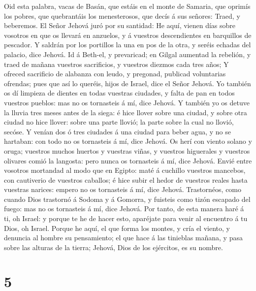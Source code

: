  Oid esta palabra, vacas de Basán, que estáis en el monte
de Samaria, que oprimís los pobres, que quebrantáis los menesterosos,
que decís á sus señores: Traed, y beberemos.  El Señor
Jehová juró por su santidad: He aquí, vienen días sobre vosotros en que
os llevará en anzuelos, y á vuestros descendientes en barquillos de
pescador.  Y saldrán por los portillos la una en pos de la
otra, y seréis echadas del palacio, dice Jehová.  Id á
Beth-el, y prevaricad; en Gilgal aumentad la rebelión, y traed de mañana
vuestros sacrificios, y vuestros diezmos cada tres años; 
Y ofreced sacrificio de alabanza con leudo, y pregonad, publicad
voluntarias ofrendas; pues que así lo queréis, hijos de Israel, dice el
Señor Jehová.  Yo también os dí limpieza de dientes en
todas vuestras ciudades, y falta de pan en todos vuestros pueblos: mas
no os tornasteis á mí, dice Jehová.  Y también yo os
detuve la lluvia tres meses antes de la siega: é hice llover sobre una
ciudad, y sobre otra ciudad no hice llover: sobre una parte llovió; la
parte sobre la cual no llovió, secóse.  Y venían dos ó
tres ciudades á una ciudad para beber agua, y no se hartaban: con todo
no os tornasteis á mí, dice Jehová.  Os herí con viento
solano y oruga; vuestros muchos huertos y vuestras viñas, y vuestros
higuerales y vuestros olivares comió la langosta: pero nunca os
tornasteis á mí, dice Jehová.  Envié entre vosotros
mortandad al modo que en Egipto: maté á cuchillo vuestros mancebos, con
cautiverio de vuestros caballos; é hice subir el hedor de vuestros
reales hasta vuestras narices: empero no os tornasteis á mí, dice
Jehová.  Trastornéos, como cuando Dios trastornó á Sodoma
y á Gomorra, y fuisteis como tizón escapado del fuego: mas no os
tornasteis á mí, dice Jehová.  Por tanto, de esta manera
haré á ti, oh Israel: y porque te he de hacer esto, aparéjate para venir
al encuentro á tu Dios, oh Israel.  Porque he aquí, el
que forma los montes, y cría el viento, y denuncia al hombre su
pensamiento; el que hace á las tinieblas mañana, y pasa sobre las
alturas de la tierra; Jehová, Dios de los ejércitos, es su nombre.

\hypertarget{section-4}{%
\section{5}\label{section-4}}

